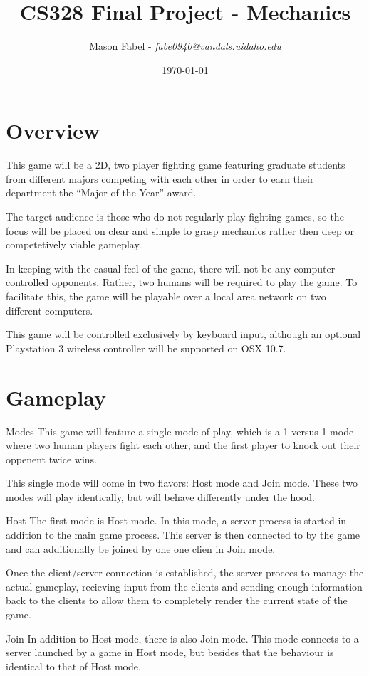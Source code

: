 \documentclass[12pt]{report}
\title{CS328 Final Project - Mechanics}
\date{\today}
\author{Mason Fabel - \textit{fabe0940@vandals.uidaho.edu}}
\begin{document}
\maketitle

\tableofcontents
\clearpage

\chapter{Overview}

This game will be a 2D, two player fighting game featuring graduate students
from different majors competing with each other in order to earn their
department the ``Major of the Year'' award.

The target audience is those who do not regularly play fighting games, so the
focus will be placed on clear and simple to grasp mechanics rather then deep
or competetively viable gameplay.

In keeping with the casual feel of the game, there will not be any computer
controlled opponents. Rather, two humans will be required to play the game.
To facilitate this, the game will be playable over a local area network on
two different computers.

This game will be controlled exclusively by keyboard input, although an optional
Playstation 3 wireless controller will be supported on OSX 10.7.

\chapter{Gameplay}

\begin{section}{Modes}
This game will feature a single mode of play, which is a 1 versus 1 mode where
two human players fight each other, and the first player to knock out their
oppenent twice wins.

This single mode will come in two flavors: Host mode and Join mode. These two
modes will play identically, but will behave differently under the hood.

\begin{subsection}{Host}
The first mode is Host mode. In this mode, a server process is started in
addition to the main game process. This server is then connected to by the game
and can additionally be joined by one one clien in Join mode.

Once the client/server connection is established, the server procees to manage
the actual gameplay, recieving input from the clients and sending enough
information back to the clients to allow them to completely render the current
state of the game.
\end{subsection}

\begin{subsection}{Join}
In addition to Host mode, there is also Join mode. This mode connects to a
server launched by a game in Host mode, but besides that the behaviour is
identical to that of Host mode.
\end{subsection}

\end{section}
\end{document}
